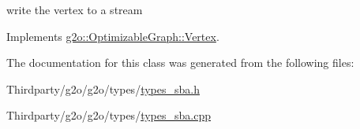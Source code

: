 write the vertex to a stream 



Implements \mbox{\hyperlink{classg2o_1_1_optimizable_graph_1_1_vertex_a4cac277db656fddb5f844d9009d601eb}{g2o\+::\+Optimizable\+Graph\+::\+Vertex}}.



The documentation for this class was generated from the following files\+:\begin{DoxyCompactItemize}
\item 
Thirdparty/g2o/g2o/types/\mbox{\hyperlink{types__sba_8h}{types\+\_\+sba.\+h}}\item 
Thirdparty/g2o/g2o/types/\mbox{\hyperlink{types__sba_8cpp}{types\+\_\+sba.\+cpp}}\end{DoxyCompactItemize}
